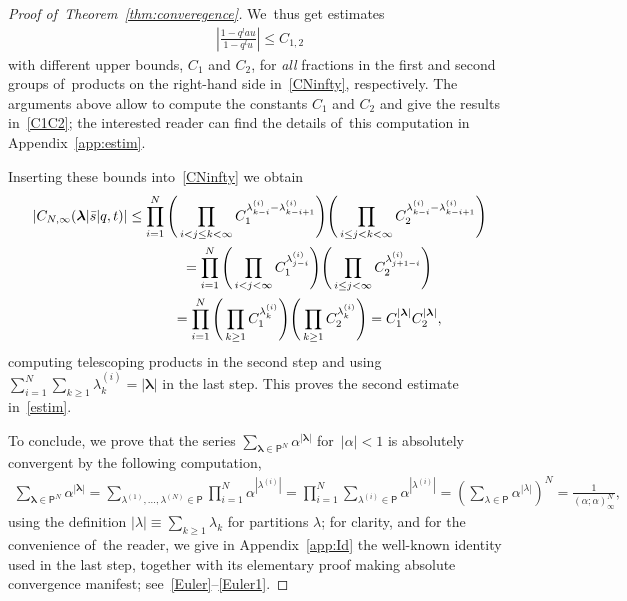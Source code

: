 \documentclass[pdftex]{sigma}%
\numberwithin{equation}{section}
\newcommand{\vlam}{\boldsymbol{\lambda}}
\newcommand{\bs}{\bar{s}}
\begin{document}
\begin{proof}[Proof of~Theorem~\ref{thm:converegence}]
We~thus get estimates
\begin{gather*}
\left|\frac{1-q^{l}au}{1-q^l u}\right| \leq C_{1,2}
\end{gather*}
with different upper bounds, $C_1$ and $C_2$, for {\em all} fractions in the first and second groups of~pro\-ducts on the right-hand side in~\eqref{CNinfty}, respectively.
The arguments above allow to compute the constants $C_1$ and $C_2$ and give the results in~\eqref{C1C2}; the interested reader can find the details of~this computation in Appendix~\ref{app:estim}.

Inserting these bounds into~\eqref{CNinfty} we obtain
\begin{gather}
|C_{N,\infty}(\vlam|\bs|q,t)| \leq
\prod_{i=1}^N \Bigg( \prod_{i< j\leq k< \infty} C_1^{\lambda^{(i)}_{k-i}-\lambda^{(i)}_{k-i+1}}\Bigg)\Bigg( \prod_{i\leq j< k< \infty} C_2^{\lambda^{(i)}_{k-i}-\lambda^{(i)}_{k-i+1}}\Bigg) \nonumber
\\ \hphantom{|C_{N,\infty}(\vlam|\bs|q,t)|}
{}= \prod_{i=1}^N \Bigg( \prod_{i< j< \infty} C_1^{\lambda^{(i)}_{j-i}}\Bigg)\Bigg( \prod_{i\leq j< \infty} C_2^{\lambda^{(i)}_{j+1-i}}\Bigg)\nonumber
\\ \hphantom{|C_{N,\infty}(\vlam|\bs|q,t)|}
{}= \prod_{i=1}^N \Bigg( \prod_{k\geq 1} C_1^{\lambda^{(i)}_{k}}\Bigg) \Bigg( \prod_{k\geq 1} C_2^{\lambda^{(i)}_{k}}\Bigg) = C_1^{|\vlam|}C_2^{|\vlam|},
\label{Cbound}
\end{gather}
computing telescoping products in the second step and using $\sum_{i=1}^N\sum_{k\geq 1}\lambda^{(i)}_k=|\vlam|$ in the last step.
This proves the second estimate in~\eqref{estim}.

To conclude, we prove that the series $\sum_{\vlam\in\mathsf{P}^N} \alpha^{|\vlam|}$ for~$|\alpha|<1$ is absolutely convergent by the following computation,
\begin{gather*}
\sum_{\vlam\in\mathsf{P}^N} \alpha^{|\vlam|} = \sum_{\lambda^{(1)},\dots,\lambda^{(N)}\in\mathsf{P}} \prod_{i=1}^N \alpha^{|\lambda^{(i)}|} =
 \prod_{i=1}^N \sum_{\lambda^{(i)}\in\mathsf{P}} \alpha^{|\lambda^{(i)}|} =\left( \sum_{\lambda\in\mathsf{P}} \alpha^{|\lambda|}\right)^N = \frac1{(\alpha;\alpha)_\infty^N},
\end{gather*}
using the definition $|\lambda|\equiv \sum_{k\geq 1}\lambda_k$ for partitions $\lambda$; for clarity, and for the convenience of~the reader, we give in Appendix~\ref{app:Id} the well-known identity used in the last step, together with its elementary proof making absolute convergence manifest; see~\eqref{Euler}--\eqref{Euler1}.
\end{proof}
\end{document}

